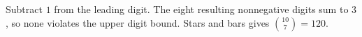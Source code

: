 Subtract $1$ from the leading digit. The eight resulting nonnegative digits sum to $3$, so none violates the upper digit bound. Stars and bars gives $\boxed{\binom{10}{7}=120}$.
